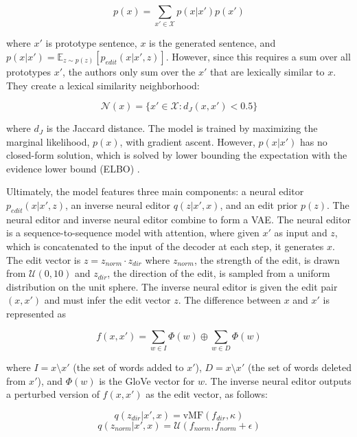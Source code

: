 \begin{equation}
p(x) = \sum_{x' \in \mathcal{X}} p(x | x') p(x')    
\end{equation}

where $x'$ is prototype sentence, $x$ is the generated sentence, and  $p(x | x') = \mathbb{E}_{z \sim p(z)} [p_{edit}(x | x', z)]$. However, since this requires a sum over all prototypes $x'$, the authors only sum over the $x'$ that are lexically similar to $x$. They create a lexical similarity neighborhood:

\begin{equation}
\mathcal{N}(x) = \{x' \in \mathcal{X} : d_J(x, x') < 0.5\}
\end{equation}

where $d_J$ is the Jaccard distance. The model is trained by maximizing the marginal likelihood, $p(x)$, with gradient ascent. However, $p(x|x')$ has no closed-form solution, which is solved by lower bounding the expectation with the evidence lower bound (ELBO) \citep{kingma2013auto}. 

Ultimately, the model features three main components: a neural editor $p_{edit}(x | x', z)$, an inverse neural editor $q(z | x', x)$, and an edit prior $p(z)$. The neural editor and inverse neural editor combine to form a VAE. The neural editor is a sequence-to-sequence model with attention, where given $x'$ as input and $z$, which is concatenated to the input of the decoder at each step, it generates $x$. The edit vector is $z = z_{norm} \cdot z_{dir}$ where $z_{norm}$, the strength of the edit, is drawn from $\mathcal{U}(0,10)$ and $z_{dir}$, the direction of the edit, is sampled from a uniform distribution on the unit sphere. The inverse neural editor is given the edit pair $(x, x')$ and must infer the edit vector $z$. The difference between $x$ and $x'$ is represented as

\begin{equation}
    f(x, x') = \sum_{w \in I} \Phi(w) \oplus \sum_{w \in D} \Phi(w)
\end{equation}

where $I = x \setminus x'$ (\ie the set of words added to $x'$), $D = x \setminus x'$ (\ie the set of words deleted from $x'$), and $\Phi(w)$ is the GloVe \citep{pennington2014glove} vector for $w$. The inverse neural editor outputs a perturbed version of $f(x, x')$ as the edit vector, as follows:

\begin{equation}
q(z_{dir} | x', x) = \text{vMF}(f_{dir}, \kappa)
\end{equation}
\begin{equation}
q(z_{norm} | x', x) = \mathcal{U}(f_{norm}, f_{norm} + \epsilon)
\end{equation}

